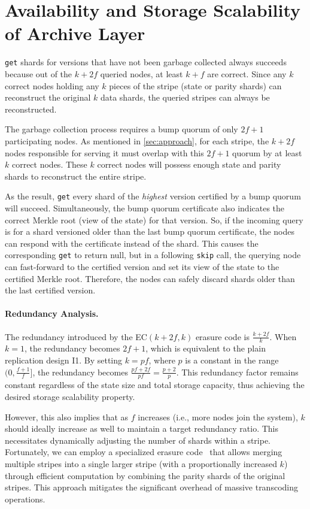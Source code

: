 \section{Availability and Storage Scalability of Archive Layer}

\texttt{get} shards for versions that have not been garbage collected always succeeds because out of the $k+2f$ queried nodes, at least $k+f$ are correct.
Since any $k$ correct nodes holding any $k$ pieces of the stripe (state or parity shards) can reconstruct the original $k$ data shards, the queried stripes can always be reconstructed.

The garbage collection process requires a bump quorum of only $2f+1$ participating nodes.
As mentioned in \cref{sec:approach}, for each stripe, the $k+2f$ nodes responsible for serving it must overlap with this $2f+1$ quorum by at least $k$ correct nodes.
These $k$ correct nodes will possess enough state and parity shards to reconstruct the entire stripe.

As the result, \texttt{get} every shard of the \emph{highest} version certified by a bump quorum will succeed.
Simultaneously, the bump quorum certificate also indicates the correct Merkle root (view of the state) for that version.
So, if the incoming query is for a shard versioned older than the last bump quorum certificate, the nodes can respond with the certificate instead of the shard.
This causes the corresponding \texttt{get} to return null, but in a following \texttt{skip} call, the querying node can fast-forward to the certified version and set its view of the state to the certified Merkle root.
Therefore, the nodes can safely discard shards older than the last certified version.

\paragraph{Redundancy Analysis.}
The redundancy introduced by the EC$(k+2f,k)$ erasure code is $\frac{k+2f}{k}$.
When $k=1$, the redundancy becomes $2f+1$, which is equivalent to the plain replication design I1.
By setting $k=pf$, where $p$ is a constant in the range $(0,\frac{f+1}{f}]$, the redundancy becomes $\frac{pf+2f}{pf} = \frac{p+2}{p}$. This redundancy factor remains constant regardless of the state size and total storage capacity, thus achieving the desired storage scalability property.

However, this also implies that as $f$ increases (i.e., more nodes join the system), $k$ should ideally increase as well to maintain a target redundancy ratio.
This necessitates dynamically adjusting the number of shards within a stripe.
Fortunately, we can employ a specialized erasure code~\cite{maturana2020access,maturana2022convertible,maturana2023bandwidth,yao2021stripemerge} that allows merging multiple stripes into a single larger stripe (with a proportionally increased $k$) through efficient computation by combining the parity shards of the original stripes.
This approach mitigates the significant overhead of massive transcoding operations.

